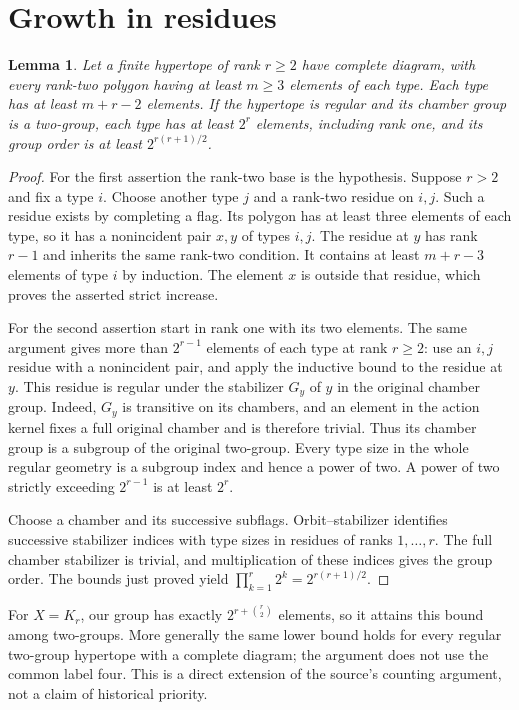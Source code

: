 \documentclass[11pt,a4paper]{article}
\newtheorem{lemma}[theorem]{Lemma}
\begin{document}
\section{Growth in residues}
\begin{lemma}
Let a finite hypertope of rank $r\geq2$ have complete diagram, with every
rank-two polygon having at least $m\geq3$ elements of each type. Each type
has at least $m+r-2$ elements. If the hypertope is regular and its chamber
group is a two-group, each type has at least $2^r$ elements, including rank
one, and its group order is at least $2^{r(r+1)/2}$.
\end{lemma}
\begin{proof}
For the first assertion the rank-two base is the hypothesis. Suppose $r>2$
and fix a type $i$. Choose another type $j$ and a rank-two residue on $i,j$.
Such a residue exists by completing a flag. Its polygon has at least three
elements of each type, so it has a nonincident pair $x,y$ of types $i,j$.
The residue at $y$ has rank $r-1$ and inherits the same rank-two condition.
It contains at least $m+r-3$ elements of type $i$ by induction. The element
$x$ is outside that residue, which proves the asserted strict increase.

For the second assertion start in rank one with its two elements. The same
argument gives more than $2^{r-1}$ elements of each type at rank $r\geq2$:
use an $i,j$ residue with a nonincident pair, and apply the inductive bound
to the residue at $y$. This residue is regular under the stabilizer $G_y$ of $y$ in the original
chamber group. Indeed, $G_y$ is transitive on its chambers, and an element
in the action kernel fixes a full original chamber and is therefore trivial.
Thus its chamber group is a subgroup of the original two-group. Every type size in the whole regular
geometry is a subgroup index and hence a power of two. A power of two
strictly exceeding $2^{r-1}$ is at least $2^r$.

Choose a chamber and its successive subflags. Orbit--stabilizer identifies
successive stabilizer indices with type sizes in residues of ranks
$1,\ldots,r$. The full chamber stabilizer is trivial, and multiplication of
these indices gives the group order. The bounds just proved yield
$\prod_{k=1}^r2^k=2^{r(r+1)/2}$.
\end{proof}

For $X=K_r$, our group has exactly $2^{r+\binom r2}$ elements, so it
attains this bound among two-groups. More generally the same lower bound
holds for every regular two-group hypertope with a complete diagram; the
argument does not use the common label four. This is a direct extension
of the source's counting argument, not a claim of historical priority.
\end{document}
